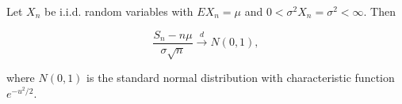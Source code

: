 Let $X_n$ be i.i.d. random variables with $E X_n = \mu$ and $0 < \sigma^2 X_n = \sigma^2 < \infty$. Then

$$\frac{S_n - n\mu}{\sigma \sqrt{n}} \xrightarrow{d} N(0, 1),$$

where $N(0,1)$ is the standard normal distribution with characteristic function $e^{-u^2/2}$.
